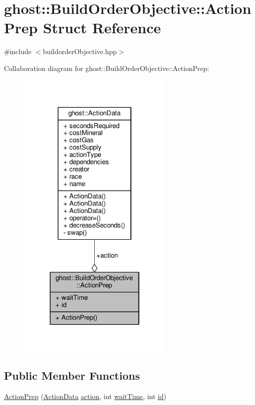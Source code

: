 \hypertarget{structghost_1_1BuildOrderObjective_1_1ActionPrep}{\section{ghost\-:\-:Build\-Order\-Objective\-:\-:Action\-Prep Struct Reference}
\label{structghost_1_1BuildOrderObjective_1_1ActionPrep}
}


{\ttfamily \#include $<$buildorder\-Objective.\-hpp$>$}



Collaboration diagram for ghost\-:\-:Build\-Order\-Objective\-:\-:Action\-Prep\-:
\nopagebreak
\begin{figure}[H]
\begin{center}
\leavevmode
\includegraphics[width=214pt]{structghost_1_1BuildOrderObjective_1_1ActionPrep__coll__graph}
\end{center}
\end{figure}
\subsection*{Public Member Functions}
\begin{DoxyCompactItemize}
\item 
\hyperlink{structghost_1_1BuildOrderObjective_1_1ActionPrep_a8a401c642c0fc1059b8821bf254c693f}{Action\-Prep} (\hyperlink{structghost_1_1ActionData}{Action\-Data} \hyperlink{structghost_1_1BuildOrderObjective_1_1ActionPrep_a9bec671b44077070fe7cc852d380c138}{action}, int \hyperlink{structghost_1_1BuildOrderObjective_1_1ActionPrep_af8a3d62c358363a6db4b392cd3f8237c}{wait\-Time}, int \hyperlink{structghost_1_1BuildOrderObjective_1_1ActionPrep_a2a3b997dfc60079d09320feca67b848e}{id})
\end{DoxyCompactItemize}
